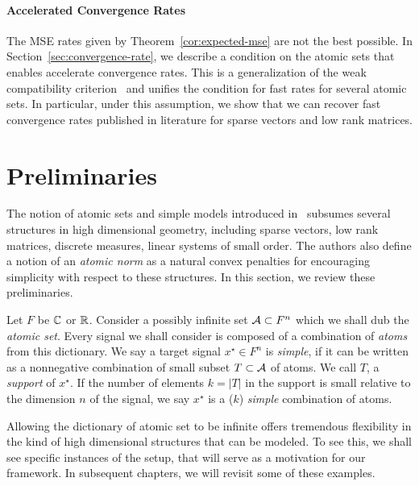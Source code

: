 \paragraph*{Accelerated Convergence Rates} The MSE rates given by
Theorem~\ref{cor:expected-mse} are not the best possible. In
Section~\ref{sec:convergence-rate}, we describe a condition on the atomic sets
that enables accelerate convergence rates. This is a generalization of the weak
compatibility criterion~\cite{degeer} and unifies the condition for fast rates
for several atomic sets. In particular, under this assumption, we show that we
can recover fast convergence rates published in literature for sparse vectors
and low rank matrices.


\section{Preliminaries}
\label{sec:ast:preliminaries}

The notion of atomic sets and simple models introduced in~\cite{crpw} subsumes
several structures in high dimensional geometry, including sparse
vectors, low rank matrices, discrete measures, linear systems of small order.
The authors also define a notion of an \emph{atomic norm} as a natural convex
penalties for encouraging simplicity with respect to these structures. In this
section, we review these preliminaries.

Let $F$ be $\mathbb{C}$ or $\mathbb{R}$. Consider a possibly infinite set $\mathcal{A} \subset F^n$ which
we shall dub the \emph{atomic set}. Every signal we shall consider is composed
of a combination of \emph{atoms} from this dictionary. We say a target signal
$x^\star \in F^n$ is \emph{simple}, if it can be written as a nonnegative
combination of small subset $T \subset \mathcal{A}$ of atoms. We call $T$, a
\emph{support} of $x^\star$. If the number of elements $k = |T|$ in the support
is small relative to the dimension $n$ of the signal, we say $x^\star$ is a
($k$) \emph{simple} combination of atoms.

Allowing the dictionary of atomic set to be infinite offers tremendous
flexibility in the kind of high dimensional structures that can be modeled. To
see this, we shall see specific instances of the setup, that will serve as a
motivation for our framework. In subsequent chapters, we will revisit some of
these examples.

